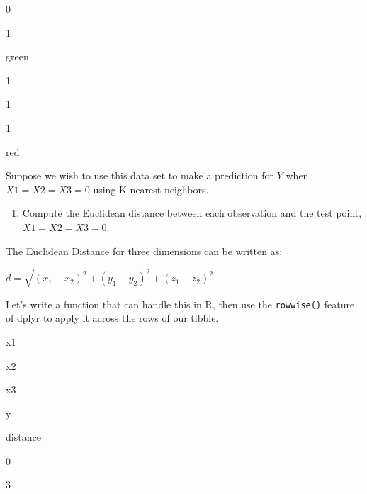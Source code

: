 \documentclass[]{book}
\newenvironment{Shaded}{\begin{snugshade}}{\end{snugshade}}
\newcommand{\KeywordTok}[1]{\textcolor[rgb]{0.13,0.29,0.53}{\textbf{#1}}}
\newcommand{\DataTypeTok}[1]{\textcolor[rgb]{0.13,0.29,0.53}{#1}}
\newcommand{\DecValTok}[1]{\textcolor[rgb]{0.00,0.00,0.81}{#1}}
\newcommand{\StringTok}[1]{\textcolor[rgb]{0.31,0.60,0.02}{#1}}
\newcommand{\ControlFlowTok}[1]{\textcolor[rgb]{0.13,0.29,0.53}{\textbf{#1}}}
\newcommand{\OperatorTok}[1]{\textcolor[rgb]{0.81,0.36,0.00}{\textbf{#1}}}
\newcommand{\NormalTok}[1]{#1}
\providecommand{\tightlist}{%
  \setlength{\itemsep}{0pt}\setlength{\parskip}{0pt}}
\theoremstyle{definition}
\theoremstyle{definition}
\theoremstyle{definition}
\theoremstyle{remark}
\begin{document}
0

1

green

1

1

1

red

Suppose we wish to use this data set to make a prediction for \(Y\) when
\(X1 = X2 = X3 = 0\) using K-nearest neighbors.

\begin{enumerate}
\def\labelenumi{(\alph{enumi})}
\tightlist
\item
  Compute the Euclidean distance between each observation and the test
  point, \(X1 = X2 = X3 = 0\).
\end{enumerate}

The Euclidean Distance for three dimensions can be written as:

\(d = \sqrt {\left( {x_1 - x_2 } \right)^2 + \left( {y_1 - y_2 } \right)^2 + \left( {z_1 - z_2 } \right)^2 }\)

Let's write a function that can handle this in R, then use the
\texttt{rowwise()} feature of dplyr to apply it across the rows of our
tibble.

\begin{Shaded}
\end{Shaded}

x1

x2

x3

y

distance

0

3
\end{document}
